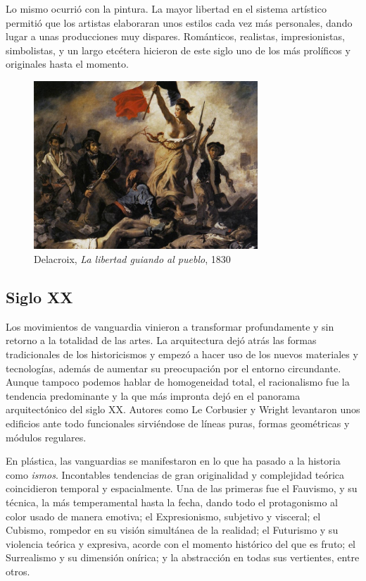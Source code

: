 Lo mismo ocurrió con la pintura. La mayor libertad en el sistema artístico permitió que los artistas elaboraran unos estilos cada vez más personales, dando lugar a unas producciones muy dispares. Románticos, realistas, impresionistas, simbolistas, y un largo etcétera hicieron de este siglo uno de los más prolíficos y originales hasta el momento.

\begin{figure}[!h]
    \begin{center}
        \includegraphics[width=0.75\textwidth]{imagenes/2/libertad-guiando.jpg}
        \caption{Delacroix, \textit{La libertad guiando al pueblo}, 1830}
        \label{fig:libertdad-guiando-pueblo}
    \end{center}
\end{figure}

\subsection{Siglo XX}

Los movimientos de vanguardia vinieron a transformar profundamente y sin retorno a la totalidad de las artes. La arquitectura dejó atrás las formas tradicionales de los historicismos y empezó a hacer uso de los nuevos materiales y tecnologías, además de aumentar su preocupación por el entorno circundante. Aunque tampoco podemos hablar de homogeneidad total, el racionalismo fue la tendencia predominante y la que más impronta dejó en el panorama arquitectónico del siglo XX. Autores como Le Corbusier y Wright levantaron unos edificios ante todo funcionales sirviéndose de líneas puras, formas geométricas y módulos regulares.

En plástica, las vanguardias se manifestaron en lo que ha pasado a la historia como \textit{ismos}. Incontables tendencias de gran originalidad y complejidad teórica coincidieron temporal y espacialmente. Una de las primeras fue el Fauvismo, y su técnica, la más temperamental hasta la fecha, dando todo el protagonismo al color usado de manera emotiva; el Expresionismo, subjetivo y visceral; el Cubismo, rompedor en su visión simultánea de la realidad; el Futurismo y su violencia teórica y expresiva, acorde con el momento histórico del que es fruto; el Surrealismo y su dimensión onírica; y la abstracción en todas sus vertientes, entre otros.

